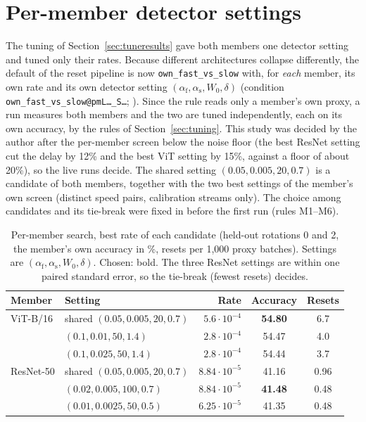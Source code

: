 \documentclass[10pt]{article}
\newcommand{\rl}[1]{\texttt{#1}}
\newcommand{\vit}{ViT-B/16}
\newcommand{\rn}{ResNet-50}
\begin{document}
\section{Per-member detector settings}\label{sec:permember}
The tuning of Section~\ref{sec:tuneresults} gave both members one detector setting and tuned only their rates. Because different architectures collapse differently, the default of the reset pipeline is now \rl{own\_fast\_vs\_slow} with, for \emph{each} member, its own rate and its own detector setting $(\alpha_{\mathrm f}, \alpha_{\mathrm s}, W_0, \delta)$ (condition \rl{own\_fast\_vs\_slow@pmL\dots\_S\dots}; ). Since the rule reads only a member's own proxy, a run measures both members and the two are tuned independently, each on its own accuracy, by the rules of Section~\ref{sec:tuning}. This study was decided by the author after the per-member screen below the noise floor (the best ResNet setting cut the delay by 12\% and the best ViT setting by 15\%, against a floor of about 20\%), so the live runs decide. The shared setting $(0.05, 0.005, 20, 0.7)$ is a candidate of both members, together with the two best settings of the member's own screen (distinct speed pairs, calibration streams only). The choice among candidates and its tie-break were fixed in  before the first run (rules M1--M6).

\begin{table}[t]
  \centering\small
  \caption{Per-member search, best rate of each candidate (held-out rotations 0 and 2, the member's own accuracy in \%, resets per 1,000 proxy batches). Settings are $(\alpha_{\mathrm f}, \alpha_{\mathrm s}, W_0, \delta)$. Chosen: bold. The three ResNet settings are within one paired standard error, so the tie-break (fewest resets) decides.}
  \label{tab:member_search}
  \begin{tabular}{@{}llrcc@{}}
    \toprule
    Member & Setting & Rate & Accuracy & Resets \\
    \midrule
    \vit{} & shared $(0.05, 0.005, 20, 0.7)$ & $5.6 \cdot 10^{-4}$ & \textbf{54.80} & 6.7 \\
     & $(0.1, 0.01, 50, 1.4)$ & $2.8 \cdot 10^{-4}$ & 54.47 & 4.0 \\
     & $(0.1, 0.025, 50, 1.4)$ & $2.8 \cdot 10^{-4}$ & 54.44 & 3.7 \\
    \midrule
    \rn{} & shared $(0.05, 0.005, 20, 0.7)$ & $8.84 \cdot 10^{-5}$ & 41.16 & 0.96 \\
     & $(0.02, 0.005, 100, 0.7)$ & $8.84 \cdot 10^{-5}$ & \textbf{41.48} & 0.48 \\
     & $(0.01, 0.0025, 50, 0.5)$ & $6.25 \cdot 10^{-5}$ & 41.35 & 0.48 \\
    \bottomrule
  \end{tabular}
\end{table}
\end{document}
